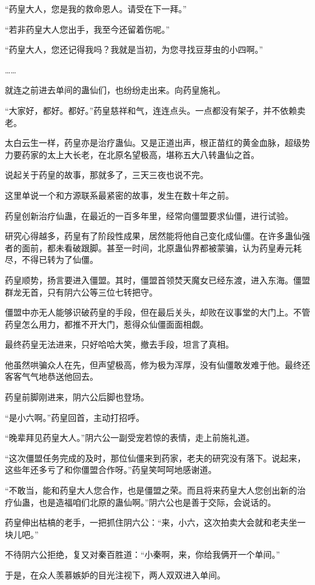 \begin{this_body}
“药皇大人，您是我的救命恩人。请受在下一拜。”

“若非药皇大人您出手，我至今还留着伤呢。”

“药皇大人，您还记得我吗？我就是当初，为您寻找豆芽虫的小四啊。”

……

就连之前进去单间的蛊仙们，也纷纷走出来。向药皇施礼。

“大家好，都好。都好。”药皇慈祥和气，连连点头。一点都没有架子，并不依赖卖老。

太白云生一样，药皇亦是治疗蛊仙。又是正道出声，根正苗红的黄金血脉，超级势力要药家的太上大长老，在北原名望极高，堪称五大八转蛊仙之首。

说起关于药皇的故事，那就多了，三天三夜也说不完。

这里单说一个和方源联系最紧密的故事，发生在数十年之前。

药皇创新治疗仙蛊，在最近的一百多年里，经常向僵盟要求仙僵，进行试验。

研究心得越多，药皇有了阶段性成果，居然能将他自己变化成仙僵。在许多蛊仙强者的面前，都未看破跟脚。甚至一时间，北原蛊仙界都被蒙骗，认为药皇寿元耗尽，不得已转为了仙僵。

药皇顺势，扬言要进入僵盟。其时，僵盟首领焚天魔女已经东渡，进入东海。僵盟群龙无首，只有阴六公等三位七转把守。

僵盟中亦无人能够识破药皇的手段，但在最后关头，却败在议事堂的大门上。不管药皇怎么用力，都推不开大门，惹得众仙僵面面相觑。

最终药皇无法进来，只好哈哈大笑，撤去手段，坦言了真相。

他虽然哄骗众人在先，但声望极高，修为极为浑厚，没有仙僵敢发难于他。最终还客客气气地恭送他回去。

药皇前脚刚进来，阴六公后脚也登场。

“是小六啊。”药皇回首，主动打招呼。

“晚辈拜见药皇大人。”阴六公一副受宠若惊的表情，走上前施礼道。

“这次僵盟任务完成的及时，那位仙僵来到药家，老夫的研究没有落下。说起来，这些年还多亏了和你僵盟合作呀。”药皇笑呵呵地感谢道。

“不敢当，能和药皇大人您合作，也是僵盟之荣。而且将来药皇大人您创出新的治疗仙蛊，也是造福咱们北原的蛊仙啊。”阴六公也是善于交际，会说话的。

药皇伸出枯槁的老手，一把抓住阴六公：“来，小六，这次拍卖大会就和老夫坐一块儿吧。”

不待阴六公拒绝，复又对秦百胜道：“小秦啊，来，你给我俩开一个单间。”

于是，在众人羡慕嫉妒的目光注视下，两人双双进入单间。


\end{this_body}
